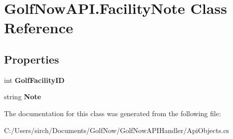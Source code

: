 \hypertarget{class_golf_now_a_p_i_1_1_facility_note}{}\section{Golf\+Now\+A\+P\+I.\+Facility\+Note Class Reference}
\label{class_golf_now_a_p_i_1_1_facility_note}
\subsection*{Properties}
\begin{DoxyCompactItemize}
\item 
\mbox{\label{class_golf_now_a_p_i_1_1_facility_note_adff84c8caf11846148d58645384d7389}} 
int {\bfseries Golf\+Facility\+ID}
\item 
\mbox{\label{class_golf_now_a_p_i_1_1_facility_note_aaea072fc2acb619fc3f83111fa2271bc}} 
string {\bfseries Note}
\end{DoxyCompactItemize}


The documentation for this class was generated from the following file\+:\begin{DoxyCompactItemize}
\item 
C\+:/\+Users/sirch/\+Documents/\+Golf\+Now/\+Golf\+Now\+A\+P\+I\+Handler/Api\+Objects.\+cs\end{DoxyCompactItemize}
